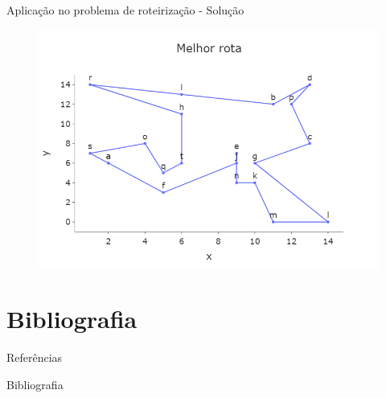 \documentclass{beamer}
\begin{document}
\begin{frame}{Aplicação no problema de roteirização - Solução}
     \begin{figure}
        \centering
        \includegraphics[width = 0.8 \textwidth]{assets/Resolucoes/melhor rota.png}
        \label{fig:enter-label}
    \end{figure}
\end{frame}

\section{Bibliografia}

\nocite{*}
\begin{frame}[allowframebreaks]{Referências}
    \printbibliography[category=cited]
\end{frame}

\begin{frame}[allowframebreaks]{Bibliografia}
    \printbibliography[notcategory=cited]
\end{frame}
\end{document}
